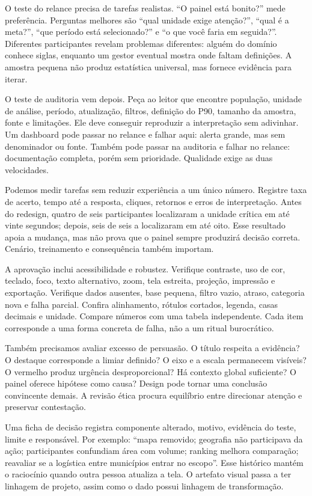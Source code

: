 O teste do relance precisa de tarefas realistas. ``O painel está bonito?'' mede preferência. Perguntas melhores são ``qual unidade exige atenção?'', ``qual é a meta?'', ``que período está selecionado?'' e ``o que você faria em seguida?''. Diferentes participantes revelam problemas diferentes: alguém do domínio conhece siglas, enquanto um gestor eventual mostra onde faltam definições. A amostra pequena não produz estatística universal, mas fornece evidência para iterar.

O teste de auditoria vem depois. Peça ao leitor que encontre população, unidade de análise, período, atualização, filtros, definição do P90, tamanho da amostra, fonte e limitações. Ele deve conseguir reproduzir a interpretação sem adivinhar. Um dashboard pode passar no relance e falhar aqui: alerta grande, mas sem denominador ou fonte. Também pode passar na auditoria e falhar no relance: documentação completa, porém sem prioridade. Qualidade exige as duas velocidades.

Podemos medir tarefas sem reduzir experiência a um único número. Registre taxa de acerto, tempo até a resposta, cliques, retornos e erros de interpretação. Antes do redesign, quatro de seis participantes localizaram a unidade crítica em até vinte segundos; depois, seis de seis a localizaram em até oito. Esse resultado apoia a mudança, mas não prova que o painel sempre produzirá decisão correta. Cenário, treinamento e consequência também importam.

A aprovação inclui acessibilidade e robustez. Verifique contraste, uso de cor, teclado, foco, texto alternativo, zoom, tela estreita, projeção, impressão e exportação. Verifique dados ausentes, base pequena, filtro vazio, atraso, categoria nova e falha parcial. Confira alinhamento, rótulos cortados, legenda, casas decimais e unidade. Compare números com uma tabela independente. Cada item corresponde a uma forma concreta de falha, não a um ritual burocrático.

Também precisamos avaliar excesso de persuasão. O título respeita a evidência? O destaque corresponde a limiar definido? O eixo e a escala permanecem visíveis? O vermelho produz urgência desproporcional? Há contexto global suficiente? O painel oferece hipótese como causa? Design pode tornar uma conclusão convincente demais. A revisão ética procura equilíbrio entre direcionar atenção e preservar contestação.

Uma ficha de decisão registra componente alterado, motivo, evidência do teste, limite e responsável. Por exemplo: ``mapa removido; geografia não participava da ação; participantes confundiam área com volume; ranking melhora comparação; reavaliar se a logística entre municípios entrar no escopo''. Esse histórico mantém o raciocínio quando outra pessoa atualiza a tela. O artefato visual passa a ter linhagem de projeto, assim como o dado possui linhagem de transformação.

